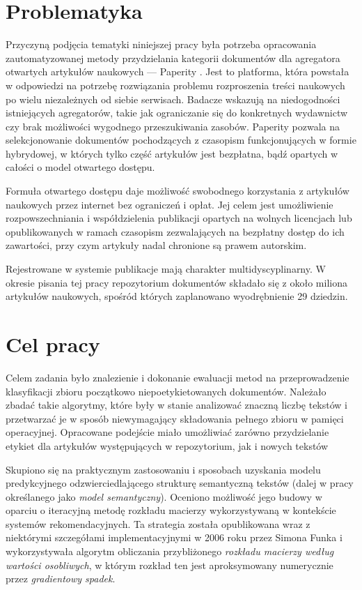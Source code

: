 \documentclass{pracamgr}
\begin{document}
\section{Problematyka}

Przyczyną podjęcia tematyki niniejszej pracy była potrzeba opracowania zautomatyzowanej metody przydzielania kategorii dokumentów dla agregatora otwartych artykułów naukowych --- Paperity \cite{paperity}. Jest to platforma, która powstała w odpowiedzi na potrzebę rozwiązania problemu rozproszenia treści naukowych po wielu niezależnych od siebie serwisach. Badacze wskazują na niedogodności istniejących agregatorów, takie jak ograniczanie się do konkretnych wydawnictw czy brak możliwości wygodnego przeszukiwania zasobów. Paperity pozwala na selekcjonowanie dokumentów pochodzących z czasopism funkcjonujących w formie hybrydowej, w których tylko część artykułów jest bezpłatna, bądź opartych w całości o model otwartego dostępu. 

Formuła otwartego dostępu daje możliwość swobodnego korzystania z artykułów naukowych przez internet bez ograniczeń i opłat. Jej celem jest umożliwienie rozpowszechniania i współdzielenia publikacji opartych na wolnych licencjach lub opublikowanych w ramach czasopism zezwalających na bezpłatny dostęp do ich zawartości, przy czym artykuły nadal chronione są prawem autorskim.

Rejestrowane w systemie publikacje mają charakter multidyscyplinarny. W okresie pisania tej pracy repozytorium dokumentów składało się z około miliona artykułów naukowych, spośród których zaplanowano wyodrębnienie 29 dziedzin.

\section{Cel pracy}

Celem zadania było znalezienie i dokonanie ewaluacji metod na przeprowadzenie klasyfikacji zbioru początkowo niepoetykietowanych dokumentów. Należało zbadać takie algorytmy, które były w stanie analizować znaczną liczbę tekstów i przetwarzać je w sposób niewymagający składowania pełnego zbioru w pamięci operacyjnej. Opracowane podejście miało umożliwiać zarówno przydzielanie etykiet dla artykułów występujących w repozytorium, jak i nowych tekstów

Skupiono się na praktycznym zastosowaniu i sposobach uzyskania modelu predykcyjnego odzwierciedlającego strukturę semantyczną tekstów (dalej w pracy określanego jako \textit{model semantyczny}). Oceniono możliwość jego budowy w oparciu o iteracyjną metodę rozkładu macierzy wykorzystywaną w kontekście systemów rekomendacyjnych. Ta strategia została opublikowana wraz z niektórymi szczegółami implementacyjnymi w 2006 roku przez Simona Funka \cite{funk} i wykorzystywała algorytm obliczania przybliżonego \textit{rozkładu macierzy według wartości osobliwych}, w którym rozkład ten jest aproksymowany numerycznie przez \textit{gradientowy spadek}.
\end{document}
